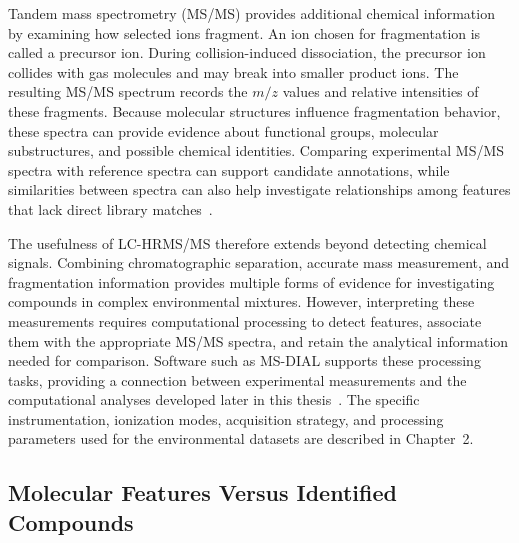         Tandem mass spectrometry (MS/MS) provides additional chemical information by examining how selected ions fragment. An ion chosen for fragmentation is called a precursor ion. During collision-induced dissociation, the precursor ion collides with gas molecules and may break into smaller product ions. The resulting MS/MS spectrum records the $m/z$ values and relative intensities of these fragments. Because molecular structures influence fragmentation behavior, these spectra can provide evidence about functional groups, molecular substructures, and possible chemical identities. Comparing experimental MS/MS spectra with reference spectra can support candidate annotations, while similarities between spectra can also help investigate relationships among features that lack direct library matches~\cite{Kind2018,Hupatz2025}.

        The usefulness of LC-HRMS/MS therefore extends beyond detecting chemical signals. Combining chromatographic separation, accurate mass measurement, and fragmentation information provides multiple forms of evidence for investigating compounds in complex environmental mixtures. However, interpreting these measurements requires computational processing to detect features, associate them with the appropriate MS/MS spectra, and retain the analytical information needed for comparison. Software such as MS-DIAL supports these processing tasks, providing a connection between experimental measurements and the computational analyses developed later in this thesis~\cite{Tsugawa2015}. The specific instrumentation, ionization modes, acquisition strategy, and processing parameters used for the environmental datasets are described in Chapter~2.

    \subsection{Molecular Features Versus Identified Compounds}\label{subsec:features-compounds}


